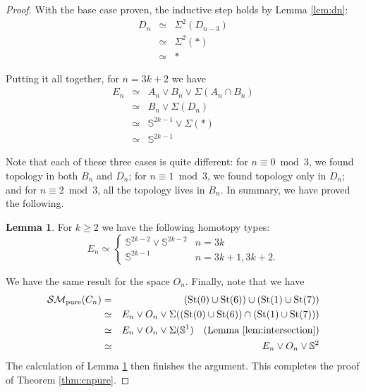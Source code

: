 \documentclass{amsart}
\theoremstyle{definition}
\newtheorem{lemma}[theorem]{Lemma}
\newcommand{\zs}{{\mathbb S}}
\newcommand{\smpure}{{\mathcal{SM}}_{\textrm{pure}}}
\begin{document}
\begin{proof}
With the base case proven, the inductive step holds by Lemma \ref{lem:dn}:
    \begin{eqnarray*}
        D_n &\simeq & \Sigma^2(D_{n-3})\\
        &\simeq &\Sigma^2(*)\\
        &\simeq & \ast
    \end{eqnarray*}

Putting it all together, for $n=3k+2$ we have 
\begin{eqnarray*}
    E_n &\simeq & A_n\vee B_n\vee\Sigma(A_n\cap B_n)\\
    &\simeq & B_n\vee\Sigma(D_n)\\
    &\simeq & \zs^{2k-1}\vee\Sigma(*)\\
    &\simeq & \zs^{2k-1}
\end{eqnarray*}

Note that each of these three cases is quite different: for $n\equiv 0\bmod 3$, we found topology in both $B_n$ and $D_n$; for $n\equiv 1\bmod 3$, we found topology only in $D_n$; and for $n\equiv 2\bmod 3$, all the topology lives in $B_n$. In summary, we have proved the following.

\begin{lemma}\label{lem:en}
    For $k\ge 2$ we have the following homotopy types:
    $$E_n \simeq \begin{cases}
        \zs^{2k-2}\vee \zs^{2k-2} & n = 3k \\
        \zs^{2k-1} & n=3k+1,3k+2.
    \end{cases}$$
\end{lemma}

We have the same result for the space $O_n$. Finally, note that we have
\begin{eqnarray*}
    \smpure(C_n)& = & (\text{St}(0)\cup\text{St}(6))\cup (\text{St}(1)\cup\text{St}(7))\\
    &\simeq & E_n\vee O_n\vee\Sigma((\text{St}(0)\cup\text{St}(6))\cap (\text{St}(1)\cup\text{St}(7)))\\
    &\simeq & E_n\vee O_n\vee\Sigma(\zs^1)\quad (\textrm{Lemma \ref{lem:intersection}})\\
    &\simeq & E_n\vee O_n\vee\zs^2
\end{eqnarray*}
The calculation of Lemma \ref{lem:en} then finishes the argument. This completes the proof of Theorem \ref{thm:cnpure}.
\end{proof}
\end{document}
